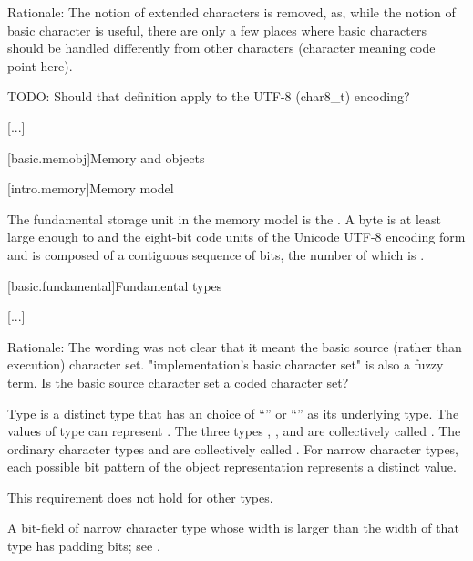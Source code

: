 \documentclass{wg21}
\begin{document}
\begin{quoteblock}
Rationale: The notion of extended characters is removed, as, while the notion of basic character is useful,
there are only a few places where basic characters should be handled differently from other characters (character meaning code point here).

TODO: Should that definition apply to the UTF-8 (char8_t) encoding?
\end{quoteblock}



[...]

[basic.memobj]{Memory and objects}

[intro.memory]{Memory model}

\pnum
{}%
The fundamental storage unit in the \Cpp{} memory model is the
.
A byte is at least large enough to 
and the eight-bit code units of the Unicode
UTF-8 encoding form
and is composed of a contiguous sequence of
bits, the number of which is .

[basic.fundamental]{Fundamental types}

[...]


\begin{quoteblock}
Rationale: The wording was not clear that it meant the basic source (rather than execution) character set.
"implementation's basic character set" is also a fuzzy term. Is the basic source character set a coded character set?
\end{quoteblock}


%
%
%
%
%
%
%
%
Type  is a distinct type
that has an  choice of
``'' or ``'' as its underlying type.
The values of type  can represent .
The three types , , and 
are collectively called
.
The ordinary character types and 
are collectively called .
For narrow character types,
each possible bit pattern of the object representation represents
a distinct value.
\begin{note}
 This requirement does not hold for other types.
\end{note}
\begin{note}
 A bit-field of narrow character type whose width is larger than the width of that type has padding bits; see .
\end{note}
\end{document}
